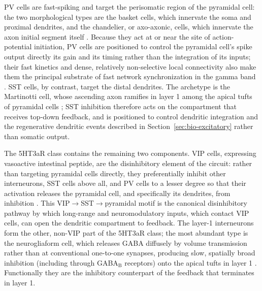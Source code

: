 PV cells are fast-spiking and target the perisomatic region of the pyramidal cell: the two morphological types are the basket cells, which innervate the soma and proximal dendrites, and the chandelier, or axo-axonic, cells, which innervate the axon initial segment itself \parencite{tremblay2016}. Because they act at or near the site of action-potential initiation, PV cells are positioned to control the pyramidal cell's spike output directly its gain and its timing rather than the integration of its inputs; their fast kinetics and dense, relatively non-selective local connectivity also make them the principal substrate of fast network synchronization in the gamma band \parencite{tremblay2016}. SST cells, by contrast, target the distal dendrites. The archetype is the Martinotti cell, whose ascending axon ramifies in layer 1 among the apical tufts of pyramidal cells \parencite{tremblay2016}; SST inhibition therefore acts on the compartment that receives top-down feedback, and is positioned to control dendritic integration and the regenerative dendritic events described in Section~\ref{sec:bio-excitatory} rather than somatic output.

The 5HT3aR class contains the remaining two components. VIP cells, expressing vasoactive intestinal peptide, are the disinhibitory element of the circuit: rather than targeting pyramidal cells directly, they preferentially inhibit other interneurons, SST cells above all, and PV cells to a lesser degree so that their activation releases the pyramidal cell, and specifically its dendrites, from inhibition \parencite{tremblay2016}. This VIP$\rightarrow$SST$\rightarrow$pyramidal motif is the canonical disinhibitory pathway by which long-range and neuromodulatory inputs, which contact VIP cells, can open the dendritic compartment to feedback. The layer-1 interneurons form the other, non-VIP part of the 5HT3aR class; the most abundant type is the neurogliaform cell, which releases GABA diffusely by volume transmission rather than at conventional one-to-one synapses, producing slow, spatially broad inhibition (including through GABA$_\text{B}$ receptors) onto the apical tufts in layer 1 \parencite{tremblay2016}. Functionally they are the inhibitory counterpart of the feedback that terminates in layer 1.

